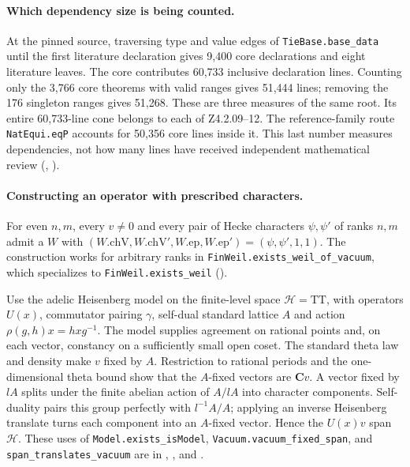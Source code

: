 \paragraph{Which dependency size is being counted.}
At the pinned source, traversing type and value edges of
\nolinkurl{TieBase.base_data} until the first literature declaration gives
9,400 core declarations and eight literature leaves. The core contributes
60,733 inclusive declaration lines. Counting only the 3,766 core
theorems with valid ranges gives 51,444 lines; removing the 176 singleton
ranges gives 51,268. These are three measures of the same root. Its
entire 60,733-line cone belongs to each of Z4.2.09--12. The reference-family
route \nolinkurl{NatEqui.eqP} accounts for 50,356 core lines inside it.
This last number measures dependencies, not how many lines have received
independent mathematical review (,
).

\paragraph{Constructing an operator with prescribed characters.}
\label{r15:weil}
For even $n,m$, every $v\ne0$ and every pair of Hecke characters
$\psi,\psi'$ of ranks $n,m$ admit a $W$ with
$(W.\mathrm{chV},W.\mathrm{chV}',W.\mathrm{ep},W.\mathrm{ep}')
=(\psi,\psi',1,1)$.
The construction works for arbitrary ranks in
\nolinkurl{FinWeil.exists_weil_of_vacuum}, which specializes to
\nolinkurl{FinWeil.exists_weil}
().

Use the adelic Heisenberg model on the finite-level space
$\mathcal H=\mathrm{TT}$, with operators $U(x)$, commutator pairing
$\gamma$, self-dual standard lattice $A$ and action
$\rho(g,h)x=hxg^{-1}$. The model supplies agreement on rational points
and, on each vector, constancy on a sufficiently small open coset.
The standard theta law and density make $v$ fixed by $A$. Restriction
to rational periods and the one-dimensional theta bound show that the
$A$-fixed vectors are $\mathbf C v$. A vector fixed by $lA$ splits
under the finite abelian action of $A/lA$ into character components.
Self-duality pairs this group perfectly with $l^{-1}A/A$; applying an
inverse Heisenberg translate turns each component into an $A$-fixed
vector. Hence the $U(x)v$ span $\mathcal H$.
These uses of \nolinkurl{Model.exists_isModel},
\nolinkurl{Vacuum.vacuum_fixed_span}, and \nolinkurl{span_translates_vacuum}
are in ,
,
and .

